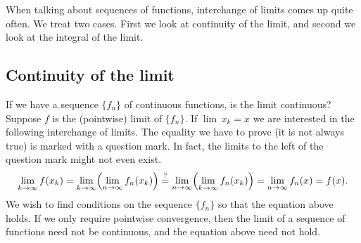 When talking about sequences of functions, interchange of limits comes up
quite often.  We treat two cases.  First we look at continuity of
the limit, and second we look at the integral of the limit.

\subsection{Continuity of the limit}

If we have a sequence $\{ f_n \}$ of continuous functions, is the limit continuous?
Suppose $f$ is the (pointwise) limit of $\{ f_n \}$.
If $\lim\, x_k = x$
we are interested in the following
interchange of limits.  The equality we have to prove (it is not always true)
is marked with a question mark.  In fact, the limits to the left
of the question mark might not even exist.
\begin{equation*}
\lim_{k \to \infty} 
f(x_k)
=
\lim_{k \to \infty} 
\Bigl(
\lim_{n \to \infty} f_n(x_k)
\Bigr)
\overset{?}{=}
\lim_{n \to \infty}
\Bigl(
\lim_{k \to \infty} 
f_n(x_k)
\Bigr)
=
\lim_{n \to \infty}
f_n(x)
=
f(x) .
\end{equation*}
We wish to find conditions on the sequence $\{ f_n \}$
so that the equation above holds.
If we only require pointwise convergence, then the limit
of a sequence of functions need not be continuous, and the equation above
need not hold.

